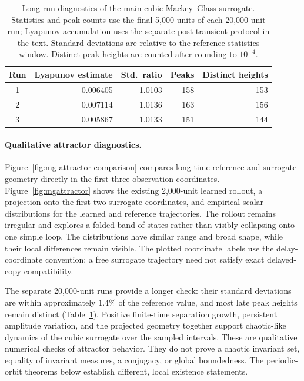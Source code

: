 \documentclass[11pt]{article}
\begin{document}
\begin{table}[htb]
\centering\small
\caption{Long-run diagnostics of the main cubic Mackey--Glass surrogate.
Statistics and peak counts use the final 5,000 units of each 20,000-unit run;
Lyapunov accumulation uses the separate post-transient protocol in the text.
Standard deviations are relative to the reference-statistics window.
Distinct peak heights are counted after rounding to $10^{-4}$.}
\label{tab:chaos}
\begin{tabular}{crrrr}
\toprule
Run & Lyapunov estimate & Std.\ ratio & Peaks & Distinct heights\\
\midrule
1 & 0.006405 & 1.0103 & 158 & 153\\
2 & 0.007114 & 1.0136 & 163 & 156\\
3 & 0.005867 & 1.0133 & 151 & 144\\
\bottomrule
\end{tabular}
\end{table}

\paragraph{Qualitative attractor diagnostics.}
Figure~\ref{fig:mg-attractor-comparison} compares long-time reference and
surrogate geometry directly in the first three observation coordinates.
Figure~\ref{fig:mgattractor} shows the existing 2,000-unit learned rollout,
a projection onto the first two surrogate coordinates, and empirical scalar
distributions for the learned and reference trajectories. The rollout remains
irregular and explores a folded band of states rather than visibly collapsing
onto one simple loop. The distributions have similar range and broad shape,
while their local differences remain visible. The plotted coordinate labels
use the delay-coordinate convention; a free surrogate trajectory need not
satisfy exact delayed-copy compatibility.

The separate 20,000-unit runs provide a longer check: their standard deviations
are within approximately $1.4\%$ of the reference value, and most late peak
heights remain distinct (Table~\ref{tab:chaos}). Positive finite-time separation
growth, persistent amplitude variation, and the projected geometry together
support chaotic-like dynamics of the cubic surrogate over the sampled intervals.
These are qualitative numerical checks of attractor behavior. They do not
prove a chaotic invariant set, equality of invariant measures, a conjugacy, or
global boundedness. The periodic-orbit theorems below establish different,
local existence statements.
\end{document}
